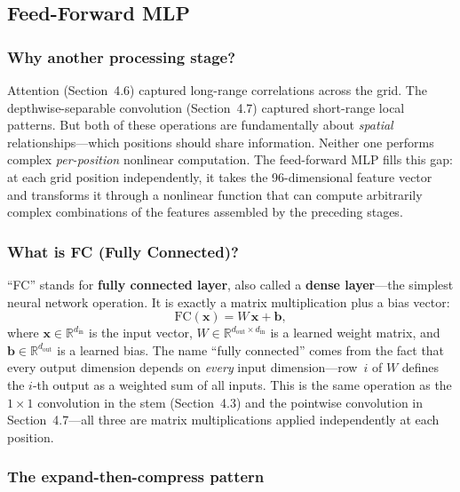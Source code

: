 \documentclass[11pt,a4paper]{article}
\begin{document}
	\subsection{Feed-Forward MLP}
	
	\subsubsection*{Why another processing stage?}
	
	Attention (Section~4.6) captured long-range correlations across the grid.  The depthwise-separable convolution (Section~4.7) captured short-range local patterns.  But both of these operations are fundamentally about \emph{spatial} relationships---which positions should share information.  Neither one performs complex \emph{per-position} nonlinear computation.  The feed-forward MLP fills this gap: at each grid position independently, it takes the 96-dimensional feature vector and transforms it through a nonlinear function that can compute arbitrarily complex combinations of the features assembled by the preceding stages.
	
	\subsubsection*{What is FC (Fully Connected)?}
	
	``FC'' stands for \textbf{fully connected layer}, also called a \textbf{dense layer}---the simplest neural network operation.  It is exactly a matrix multiplication plus a bias vector:
	\begin{equation}
		\mathrm{FC}(\mathbf{x}) = W\,\mathbf{x} + \mathbf{b},
		\label{eq:fc}
	\end{equation}
	where $\mathbf{x} \in \mathbb{R}^{d_{\mathrm{in}}}$ is the input vector, $W \in \mathbb{R}^{d_{\mathrm{out}} \times d_{\mathrm{in}}}$ is a learned weight matrix, and $\mathbf{b} \in \mathbb{R}^{d_{\mathrm{out}}}$ is a learned bias.  The name ``fully connected'' comes from the fact that every output dimension depends on \emph{every} input dimension---row~$i$ of $W$ defines the $i$-th output as a weighted sum of all inputs.  This is the same operation as the $1\!\times\!1$ convolution in the stem (Section~4.3) and the pointwise convolution in Section~4.7---all three are matrix multiplications applied independently at each position.
	
	\subsubsection*{The expand-then-compress pattern}
	
\end{document}
